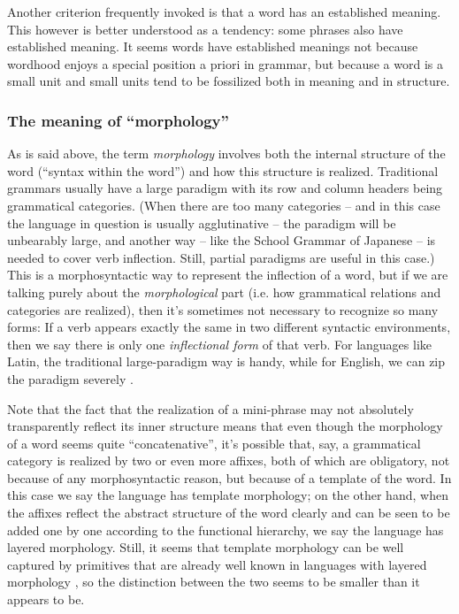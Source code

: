 \documentclass[UTF8, a4paper, oneside, scheme=plain, 12pt]{ctexbook}
\newcommand*{\citesec}[1]{\S~{#1}}
\newcommand*{\citechap}[1]{Ch~{#1}}
\newcommand*{\citechapsec}[2]{\citechap{#1}.\citesec{#2}}
\newcommand*{\term}[1]{\emph{#1}}
\begin{document}
{Another criterion frequently invoked is that 
a word has an established meaning.
This however is better understood as a tendency:
some phrases also have established meaning.
It seems words have established meanings not because 
wordhood enjoys a special position a priori in grammar, 
but because a word is a small unit 
and small units tend to be fossilized both in meaning and in structure.

\subsubsection{The meaning of ``morphology''}

As is said above, the term \term{morphology}
involves both the internal structure of the word 
(``syntax within the word'')
and how this structure is realized.
Traditional grammars usually have a large paradigm
with its row and column headers being grammatical categories.
(When there are too many categories 
-- and in this case the language in question is usually agglutinative -- 
the paradigm will be unbearably large, 
and another way -- like the School Grammar of Japanese -- is needed to cover verb inflection.
Still, partial paradigms are useful in this case.) 
This is a morphosyntactic way to represent the inflection of a word, 
but if we are talking purely about the \emph{morphological} part
(i.e. how grammatical relations and categories are realized),
then it's sometimes not necessary to recognize so many forms:
If a verb appears exactly the same in two different syntactic environments,
then we say there is only one \emph{inflectional form} of that verb.
For languages like Latin, 
the traditional large-paradigm way is handy,
while for English, we can zip the paradigm severely \citep[\citechapsec{3}{1.2}]{cgel}.

Note that the fact that the realization of a mini-phrase 
may not absolutely transparently reflect its inner structure 
means that even though the morphology of a word 
seems quite ``concatenative'',
it's possible that, say, 
a grammatical category is realized by two or even more affixes, 
both of which are obligatory,
not because of any morphosyntactic reason, 
but because of a template of the word. 
In this case we say the language has template morphology;
on the other hand, 
when the affixes reflect the abstract structure of the word clearly 
and can be seen to be added one by one 
according to the functional hierarchy,
we say the language has layered morphology.
Still, it seems that template morphology
can be well captured by primitives that are already well known 
in languages with layered morphology \cite{oxford2019fission},
so the distinction between the two seems to be smaller than it appears to be.

}
\end{document}
